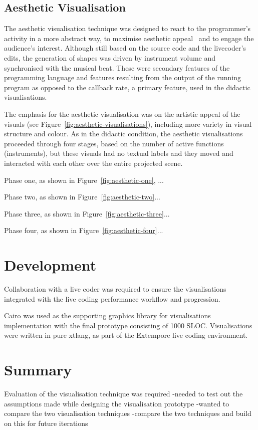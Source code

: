 \subsection{Aesthetic Visualisation}
\label{sec:aesthetic-visualisation}



The aesthetic visualisation technique was designed to react to the programmer's activity in a more abstract way, to maximise aesthetic appeal~\cite{Cawthon2007} and to engage the audience's interest. Although still based on the source code and the livecoder's edits, the generation of shapes was driven by instrument volume and synchronised with the musical beat. These were secondary features of the programming language and features resulting from the output of the running program as opposed to the callback rate, a primary feature, used in the didactic visualisations.

The emphasis for the aesthetic visualisation was on the artistic appeal of the visuals (see Figure~\ref{fig:aesthetic-visualisations}), including more variety in visual structure and colour. As in the didactic condition, the aesthetic visualisations proceeded through four stages, based on the number of active functions (instruments), but these visuals had no textual labels and they moved and interacted with each other over the entire projected scene.



Phase one, as shown in Figure~\ref{fig:aesthetic-one}, ...

Phase two, as shown in Figure~\ref{fig:aesthetic-two}...

Phase three, as shown in Figure~\ref{fig:aesthetic-three}...

Phase four, as shown in Figure~\ref{fig:aesthetic-four}...

\section{Development}

Collaboration with a live coder was required to ensure the visualisations integrated with the live coding performance workflow and progression.

Cairo was used as the supporting graphics library for visualisations implementation with the final prototype consisting of 1000 \ac{SLOC}. Visualisations were written in pure xtlang, as part of the Extempore live coding environment.


\section{Summary}

Evaluation of the visualisation technique was required 
-needed to test out the assumptions made while designing the visualisation prototype
-wanted to compare the two visualisation techniques
-compare the two techniques and build on this for future iterations



